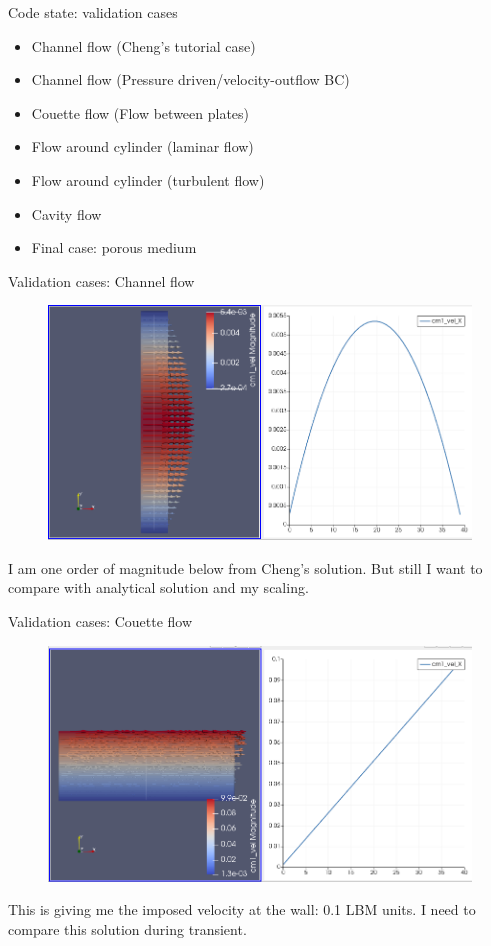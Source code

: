 \documentclass{beamer}
\begin{document}
	\begin{frame}{Code state: validation cases}
		\begin{itemize}
			\item \alert{Channel flow (Cheng's tutorial case)}
			\item Channel flow (Pressure driven/velocity-outflow BC)
			\item \alert{Couette flow (Flow between plates)}
			\item Flow around cylinder (laminar flow)
			\item \alert{Flow around cylinder (turbulent flow)}
			\item \alert{Cavity flow}
			\item Final case: porous medium
		\end{itemize}
	\end{frame}
	
	\begin{frame}{Validation cases: Channel flow}
		\begin{figure}
			\includegraphics[scale=0.3]{pics/channelForceDriven.png}
		\end{figure}
	I am one order of magnitude below from Cheng's solution. But still I want to compare with analytical solution and my scaling.
	\end{frame}
	
	\begin{frame}{Validation cases: Couette flow}
		\label{sec:CouetteFlowChannel}
		\begin{figure}
			\includegraphics[scale=0.3]{pics/couetteFlow.png}
		\end{figure}
	This is giving me the imposed velocity at the wall: 0.1 LBM units. I need to compare this solution during transient.
	\end{frame}
\end{document}
